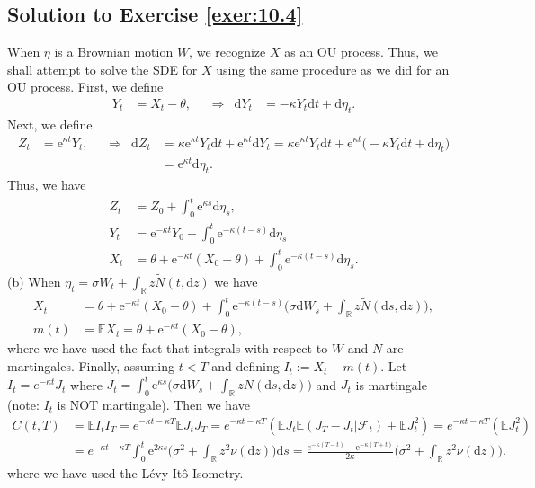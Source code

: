 \documentclass[12pt]{book}
\numberwithin{equation}{chapter}
\theoremstyle{plain}
\numberwithin{theorem}{section}
\theoremstyle{definition}
\numberwithin{exercise}{chapter}
\newcommand{\<}{\langle}
\renewcommand{\>}{\rangle}
\renewcommand{\(}{\left(}
\renewcommand{\)}{\right)}
\renewcommand{\[}{\left[}
\renewcommand{\]}{\right]}
\newcommand\Eb{\mathds{E}}
\newcommand\Rb{\mathds{R}}
\newcommand\Fc{\mathscr{F}}
\newcommand\sig{\sigma}
\newcommand\Nt{\widetilde{N}}
\newcommand\dd{\mathrm{d}}
\newcommand\ee{\mathrm{e}}
\begin{document}
\subsection*{Solution to Exercise \ref{exer:10.4}}
When $\eta$ is a Brownian motion $W$, we recognize $X$ as an OU process.  Thus, we shall attempt to solve the SDE for $X$ using the same procedure as we did for an OU process.  First, we define
\begin{align}
Y_t
	&=	X_t - \theta , &
	& \Rightarrow&
\dd Y_t
	&=	- \kappa Y_t \dd t + \dd \eta_t .
\end{align}
Next, we define
\begin{align}
Z_t
	&=	\ee^{\kappa t} Y_t , &
	&\Rightarrow&
\dd Z_t
	&=	\kappa \ee^{\kappa t} Y_t \dd t + \ee^{\kappa t} \dd Y_t
	=		\kappa \ee^{\kappa t} Y_t \dd t + \ee^{\kappa t} \Big( - \kappa Y_t \dd t + \dd \eta_t  \Big) \\ & & & &
	&=	\ee^{\kappa t} \dd \eta_t . 
\end{align}
Thus, we have
\begin{align}
Z_t
	&=	Z_0 + \int_0^t \ee^{\kappa s} \dd \eta_s , \\
Y_t
	&=	\ee^{-\kappa t} Y_0 + \int_0^t \ee^{-\kappa (t-s)}  \dd \eta_s \\
X_t
		&=	\theta + \ee^{-\kappa t} (X_0 - \theta) + \int_0^t \ee^{-\kappa (t-s)}  \dd \eta_s .
\end{align}
(b) When $\eta_t = \sig W_t + \int_\Rb z \Nt(t, \dd z)$ we have
\begin{align}
X_t
	&=	\theta + \ee^{-\kappa t} (X_0 - \theta) + \int_0^t \ee^{-\kappa (t-s)} \Big( \sig \dd W_s + \int_\Rb z \Nt(\dd s, \dd z) \Big), \\
m(t) 
	&= \Eb X_t
	 =	\theta + \ee^{-\kappa t} (X_0 - \theta) ,
\end{align}
where we have used the fact that integrals with respect to $W$ and $\Nt$ are martingales.  Finally, assuming $t < T$ and defining $I_t := X_t - m(t)$. Let $I_t = e^{-\kappa t}J_t$ where $J_t = \int_0^t \ee^{\kappa s} \Big( \sig \dd W_s + \int_\Rb z \Nt(\dd s, \dd z) \Big)$ and $J_t$ is martingale (note: $I_t$ is NOT martingale). Then we have
\begin{align}
C(t,T) 
	&= \Eb I_t I_T 
	=e^{-\kappa t-\kappa T}\Eb J_t J_T 
	= e^{-\kappa t-\kappa T}(\Eb J_t\Eb (J_T - J_t | \Fc_t ) + \Eb J_t^2) 
	=	e^{-\kappa t-\kappa T}(\Eb J_t^2) \\
	&= e^{-\kappa t-\kappa T} \int_0^t \ee^{2 \kappa s} \Big(  \sig^2 +  \int_\Rb z^2 \nu(\dd z)  \Big) \dd s 
	 =	\frac{e^{-\kappa(T-t)}-\ee^{-\kappa (T+t)}}{2 \kappa } \Big(  \sig^2 +  \int_\Rb z^2 \nu(\dd z)  \Big) .
\end{align}
where we have used the L\'evy-It\^o Isometry.
\end{document}
